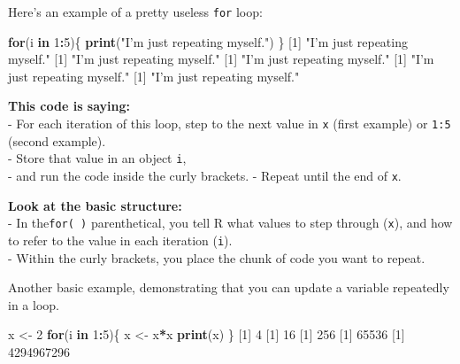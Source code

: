 \documentclass[]{book}
\newenvironment{Shaded}{\begin{snugshade}}{\end{snugshade}}
\newcommand{\ControlFlowTok}[1]{\textcolor[rgb]{0.13,0.29,0.53}{\textbf{#1}}}
\newcommand{\DecValTok}[1]{\textcolor[rgb]{0.00,0.00,0.81}{#1}}
\newcommand{\KeywordTok}[1]{\textcolor[rgb]{0.13,0.29,0.53}{\textbf{#1}}}
\newcommand{\NormalTok}[1]{#1}
\newcommand{\OperatorTok}[1]{\textcolor[rgb]{0.81,0.36,0.00}{\textbf{#1}}}
\newcommand{\StringTok}[1]{\textcolor[rgb]{0.31,0.60,0.02}{#1}}
\begin{document}
Here's an example of a pretty useless \texttt{for} loop:

\begin{Shaded}
\begin{Highlighting}[]
\ControlFlowTok{for}\NormalTok{(i }\ControlFlowTok{in} \DecValTok{1}\OperatorTok{:}\DecValTok{5}\NormalTok{)\{}
  \KeywordTok{print}\NormalTok{(}\StringTok{"I'm just repeating myself."}\NormalTok{)}
\NormalTok{\}}
\NormalTok{[}\DecValTok{1}\NormalTok{] }\StringTok{"I'm just repeating myself."}
\NormalTok{[}\DecValTok{1}\NormalTok{] }\StringTok{"I'm just repeating myself."}
\NormalTok{[}\DecValTok{1}\NormalTok{] }\StringTok{"I'm just repeating myself."}
\NormalTok{[}\DecValTok{1}\NormalTok{] }\StringTok{"I'm just repeating myself."}
\NormalTok{[}\DecValTok{1}\NormalTok{] }\StringTok{"I'm just repeating myself."}
\end{Highlighting}
\end{Shaded}

\textbf{This code is saying:}\\
- For each iteration of this loop, step to the next value in \texttt{x} (first example) or \texttt{1:5} (second example).\\
- Store that value in an object \texttt{i},\\
- and run the code inside the curly brackets.
- Repeat until the end of \texttt{x}.

\textbf{Look at the basic structure:}\\
- In the\texttt{for(\ )} parenthetical, you tell R what values to step through (\texttt{x}), and how to refer to the value in each iteration (\texttt{i}).\\
- Within the curly brackets, you place the chunk of code you want to repeat.

Another basic example, demonstrating that you can update a variable repeatedly in a loop.

\begin{Shaded}
\begin{Highlighting}[]
\NormalTok{x <-}\StringTok{ }\DecValTok{2}
\ControlFlowTok{for}\NormalTok{(i }\ControlFlowTok{in} \DecValTok{1}\OperatorTok{:}\DecValTok{5}\NormalTok{)\{}
\NormalTok{  x <-}\StringTok{ }\NormalTok{x}\OperatorTok{*}\NormalTok{x}
  \KeywordTok{print}\NormalTok{(x)}
\NormalTok{\}}
\NormalTok{[}\DecValTok{1}\NormalTok{] }\DecValTok{4}
\NormalTok{[}\DecValTok{1}\NormalTok{] }\DecValTok{16}
\NormalTok{[}\DecValTok{1}\NormalTok{] }\DecValTok{256}
\NormalTok{[}\DecValTok{1}\NormalTok{] }\DecValTok{65536}
\NormalTok{[}\DecValTok{1}\NormalTok{] }\DecValTok{4294967296}
\end{Highlighting}
\end{Shaded}
\end{document}
